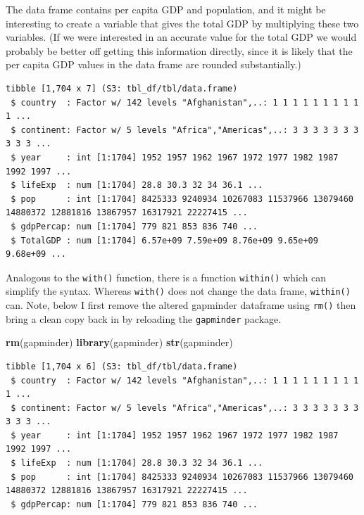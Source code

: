 \documentclass[
]{krantz}
\makeatletter
\newenvironment{Shaded}{\begin{snugshade}}{\end{snugshade}}
\newcommand{\KeywordTok}[1]{\textcolor[rgb]{0.27,0.27,0.27}{\textbf{#1}}}
\newcommand{\NormalTok}[1]{#1}
\newcommand{\OperatorTok}[1]{\textcolor[rgb]{0.43,0.43,0.43}{\textbf{#1}}}
\newcommand{\StringTok}[1]{\textcolor[rgb]{0.5,0.5,0.5}{#1}}
\newenvironment{kframe}{%
\medskip{}
\setlength{\fboxsep}{.8em}
 \def\at@end@of@kframe{}%
 \ifinner\ifhmode%
  \def\at@end@of@kframe{\end{minipage}}%
  \begin{minipage}{\columnwidth}%
 \fi\fi%
 \def\FrameCommand##1{\hskip\@totalleftmargin \hskip-\fboxsep
 \colorbox{shadecolor}{##1}\hskip-\fboxsep
     \hskip-\linewidth \hskip-\@totalleftmargin \hskip\columnwidth}%
 \MakeFramed {\advance\hsize-\width
   \@totalleftmargin\z@ \linewidth\hsize
   \@setminipage}}%
 {\par\unskip\endMakeFramed%
 \at@end@of@kframe}
\renewenvironment{Shaded}{\begin{kframe}}{\end{kframe}}
\makeatother
\begin{document}
The data frame contains per capita GDP and population, and it might be interesting to create a variable that gives the total GDP by multiplying these two variables. (If we were interested in an accurate value for the total GDP we would probably be better off getting this information directly, since it is likely that the per capita GDP values in the data frame are rounded substantially.)

\begin{Shaded}
\end{Shaded}

\begin{verbatim}
tibble [1,704 x 7] (S3: tbl_df/tbl/data.frame)
 $ country  : Factor w/ 142 levels "Afghanistan",..: 1 1 1 1 1 1 1 1 1 1 ...
 $ continent: Factor w/ 5 levels "Africa","Americas",..: 3 3 3 3 3 3 3 3 3 3 ...
 $ year     : int [1:1704] 1952 1957 1962 1967 1972 1977 1982 1987 1992 1997 ...
 $ lifeExp  : num [1:1704] 28.8 30.3 32 34 36.1 ...
 $ pop      : int [1:1704] 8425333 9240934 10267083 11537966 13079460 14880372 12881816 13867957 16317921 22227415 ...
 $ gdpPercap: num [1:1704] 779 821 853 836 740 ...
 $ TotalGDP : num [1:1704] 6.57e+09 7.59e+09 8.76e+09 9.65e+09 9.68e+09 ...
\end{verbatim}

Analogous to the \texttt{with()} function, there is a function \texttt{within()} which can simplify the syntax. Whereas \texttt{with()} does not change the data frame, \texttt{within()} can. Note, below I first remove the altered gapminder dataframe using \texttt{rm()} then bring a clean copy back in by reloading the \texttt{gapminder} package.

\begin{Shaded}
\begin{Highlighting}[]
\KeywordTok{rm}\NormalTok{(gapminder)}
\KeywordTok{library}\NormalTok{(gapminder)}
\KeywordTok{str}\NormalTok{(gapminder)}
\end{Highlighting}
\end{Shaded}

\begin{verbatim}
tibble [1,704 x 6] (S3: tbl_df/tbl/data.frame)
 $ country  : Factor w/ 142 levels "Afghanistan",..: 1 1 1 1 1 1 1 1 1 1 ...
 $ continent: Factor w/ 5 levels "Africa","Americas",..: 3 3 3 3 3 3 3 3 3 3 ...
 $ year     : int [1:1704] 1952 1957 1962 1967 1972 1977 1982 1987 1992 1997 ...
 $ lifeExp  : num [1:1704] 28.8 30.3 32 34 36.1 ...
 $ pop      : int [1:1704] 8425333 9240934 10267083 11537966 13079460 14880372 12881816 13867957 16317921 22227415 ...
 $ gdpPercap: num [1:1704] 779 821 853 836 740 ...
\end{verbatim}
\end{document}
